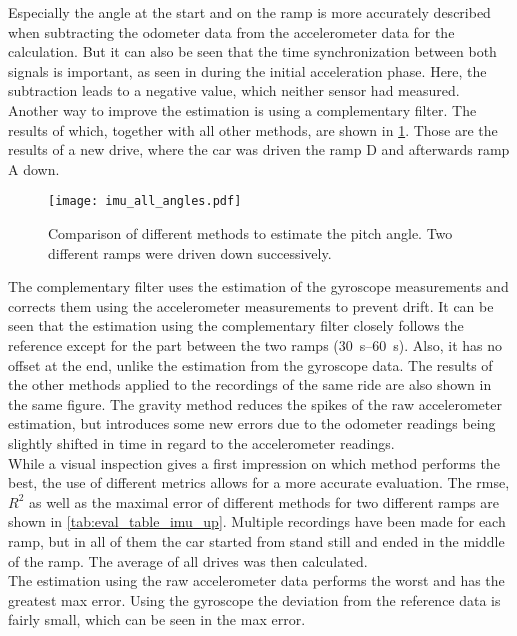Especially the angle at the start and on the ramp is more accurately described when subtracting the odometer data from the accelerometer data for the calculation.
But it can also be seen that the time synchronization between both signals is important, as seen in during the initial acceleration phase.
Here, the subtraction leads to a negative value, which neither sensor had measured.\\
Another way to improve the estimation is using a complementary filter.
The results of which, together with all other methods, are shown in \cref{fig:imu_all_angles}.
Those are the results of a new drive, where the car was driven the ramp D and afterwards ramp A down.
\begin{figure}[htb]
	\centering
	\texttt{[image: imu\_all\_angles.pdf]}
	\caption[Angle estimation using the gravity method]{Comparison of different methods to estimate the pitch angle. Two different ramps were driven down successively.}
	\label{fig:imu_all_angles}
\end{figure}
The complementary filter uses the estimation of the gyroscope measurements and corrects them using the accelerometer measurements to prevent drift.
It can be seen that the estimation using the complementary filter closely follows the reference except for the part between the two ramps (\SIrange{30}{60}{\second}).
Also, it has no offset at the end, unlike the estimation from the gyroscope data.
The results of the other methods applied to the recordings of the same ride are also shown in the same figure.
The gravity method reduces the spikes of the raw accelerometer estimation, but introduces some new errors due to the odometer readings being slightly shifted in time in regard to the accelerometer readings.\\
While a visual inspection gives a first impression on which method performs the best, the use of different metrics allows for a more accurate evaluation.
The \gls{rmse}, $R^2$ as well as the maximal error of different methods for two different ramps are shown in \cref{tab:eval_table_imu_up}.
Multiple recordings have been made for each ramp, but in all of them the car started from stand still and ended in the middle of the ramp.
The average of all drives was then calculated.\\
The estimation using the raw accelerometer data performs the worst and has the greatest max error.
Using the gyroscope the deviation from the reference data is fairly small, which can be seen in the max error.
